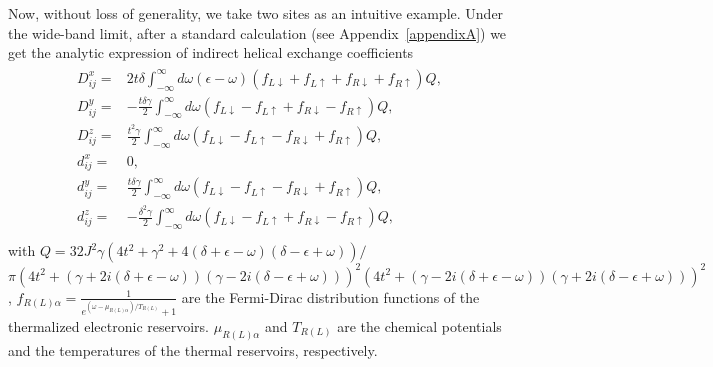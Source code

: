 \documentclass[aps,prb,twocolumn,showpacs,amssymb]{revtex4-1}
\begin{document}
Now, without loss of generality, we take two sites as an intuitive example. Under the wide-band limit, after a standard calculation (see Appendix~\ref{appendixA}) we get the analytic expression of indirect helical exchange coefficients
\begin{eqnarray}\label{equ:JHX}
\begin{aligned}
D^{x}_{ij}=&2t{\delta}\int^\infty_{-\infty}d{\omega}(\epsilon-\omega)(f_{L{\downarrow}}+f_{L{\uparrow}}+f_{R{\downarrow}}+f_{R{\uparrow}})Q,\\
D^{y}_{ij}=&-\frac{t{\delta}{\gamma}}{2}\int^\infty_{-\infty}d{\omega}(f_{L{\downarrow}}-f_{L{\uparrow}}+f_{R{\downarrow}}-f_{R{\uparrow}})Q,\\
D^{z}_{ij}=&\frac{t^2{\gamma}}{2}\int^\infty_{-\infty}d{\omega}(f_{L{\downarrow}}-f_{L{\uparrow}}-f_{R{\downarrow}}+f_{R{\uparrow}})Q,\\
d^{x}_{ij}=&0,\\
d^{y}_{ij}=&\frac{t{\delta}{\gamma}}{2}\int^\infty_{-\infty}d{\omega}(f_{L{\downarrow}}-f_{L{\uparrow}}-f_{R{\downarrow}}+f_{R{\uparrow}})Q,\\
d^{z}_{ij}=&-\frac{{\delta}^2{\gamma}}{2}\int^\infty_{-\infty}d{\omega}(f_{L{\downarrow}}-f_{L{\uparrow}}+f_{R{\downarrow}}-f_{R{\uparrow}})Q,\\
\end{aligned}
\end{eqnarray}
with $Q=32J^2\gamma(4t^2+\gamma^2+4(\delta+\epsilon-\omega)(\delta-\epsilon+\omega))/$
$\pi(4t^2+(\gamma+2i(\delta+\epsilon-\omega))(\gamma-2i(\delta-\epsilon+\omega)))^2(4t^2+(\gamma-2i(\delta+\epsilon-\omega))
(\gamma+2i(\delta-\epsilon+\omega)))^2$, $f_{R(L)\alpha}=\frac{1}{e^{(\omega-\mu_{R(L)\alpha})/T_{R(L)}}+1}$ are the Fermi-Dirac distribution functions of the thermalized electronic reservoirs. $\mu_{R(L)\alpha}$ and $T_{R(L)}$ are the chemical potentials and the temperatures of the thermal reservoirs, respectively.
\end{document}
